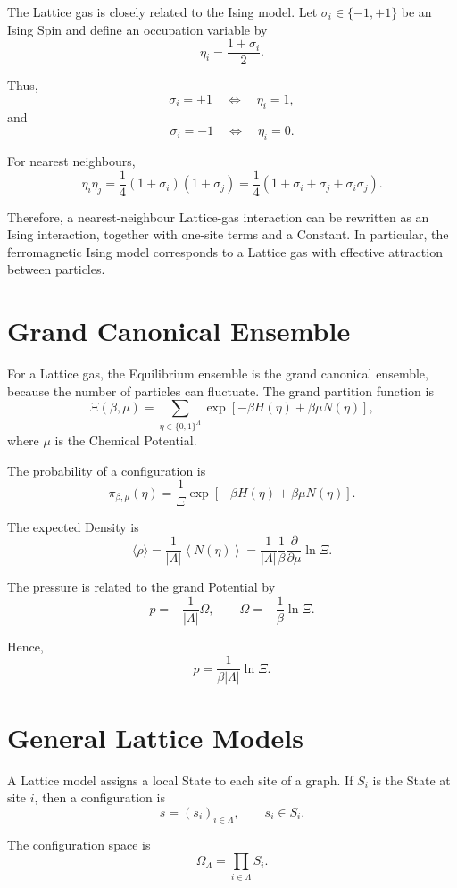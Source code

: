\documentclass[a4paper, 10pt, onepage]{elegantbook}
\begin{document}
{The Lattice gas is closely related to the Ising model. Let
\(\sigma_i\in\{-1,+1\}\) be an Ising Spin and define an occupation variable by
\[
\eta_i=\frac{1+\sigma_i}{2}.
\]

Thus,
\[
\sigma_i=+1
\quad\Longleftrightarrow\quad
\eta_i=1,
\]
and
\[
\sigma_i=-1
\quad\Longleftrightarrow\quad
\eta_i=0.
\]

For nearest neighbours,
\[
\eta_i\eta_j
=
\frac{1}{4}(1+\sigma_i)(1+\sigma_j)
=
\frac{1}{4}
\left(
1+\sigma_i+\sigma_j+\sigma_i\sigma_j
\right).
\]

Therefore, a nearest-neighbour Lattice-gas interaction can be rewritten as an
Ising interaction, together with one-site terms and a Constant. In particular,
the ferromagnetic Ising model corresponds to a Lattice gas with effective
attraction between particles.

\section{Grand Canonical Ensemble}

For a Lattice gas, the  Equilibrium ensemble is the grand canonical
ensemble, because the number of particles can fluctuate. The grand partition
function is
\[
\Xi(\beta,\mu)
=
\sum_{\eta\in\{0,1\}^{\Lambda}}
\exp\left[
-\beta H(\eta)+\beta\mu N(\eta)
\right],
\]
where \(\mu\) is the Chemical Potential.

The probability of a configuration is
\[
\pi_{\beta,\mu}(\eta)
=
\frac{1}{\Xi}
\exp\left[
-\beta H(\eta)+\beta\mu N(\eta)
\right].
\]

The expected Density is
\[
\langle\rho\rangle
=
\frac{1}{|\Lambda|}
\left\langle N(\eta)\right\rangle
=
\frac{1}{|\Lambda|}
\frac{1}{\beta}
\frac{\partial}{\partial\mu}\ln\Xi.
\]

The pressure is related to the grand Potential by
\[
p
=
-\frac{1}{|\Lambda|}\Omega,
\qquad
\Omega=-\frac{1}{\beta}\ln\Xi.
\]

Hence,
\[
p=\frac{1}{\beta|\Lambda|}\ln\Xi.
\]

\section{General Lattice Models}

A Lattice model assigns a local State to each site of a graph. If
\(S_i\) is the State at site \(i\), then a configuration is
\[
s=(s_i)_{i\in\Lambda},
\qquad
s_i\in S_i.
\]

The configuration space is
\[
\Omega_\Lambda=\prod_{i\in\Lambda}S_i.
\]

}
\end{document}
